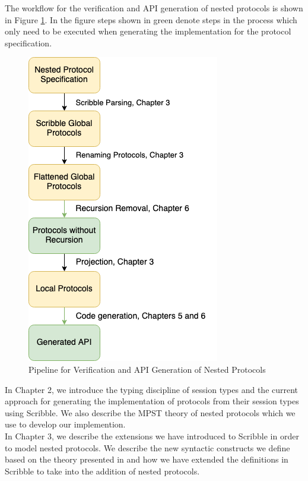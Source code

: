 \documentclass[12pt,twoside]{report}
\begin{document}
The workflow for the verification and API generation of nested protocols is shown in Figure \ref{project-pipeline}. In the figure steps shown in green denote steps in the process which only need to be executed when generating the implementation for the protocol specification.\\

\begin{figure}
    \centering
    \includegraphics[scale=0.73]{figures/pipeline.png}
    \caption{Pipeline for Verification and API Generation of Nested Protocols}
    \label{project-pipeline}
\end{figure}

In Chapter 2, we introduce the typing discipline of session types and the current approach for generating the implementation of protocols from their session types using Scribble\cite{scribble}. We also describe the MPST theory of nested protocols which we use to develop our implemention.\\

In Chapter 3, we describe the extensions we have introduced to Scribble\cite{featherweight} in order to model nested protocols. We describe the new syntactic constructs we define based on the theory presented in \cite{nestedprotocols} and how we have extended the definitions in Scribble to take into the addition of nested protocols.\\
\end{document}

